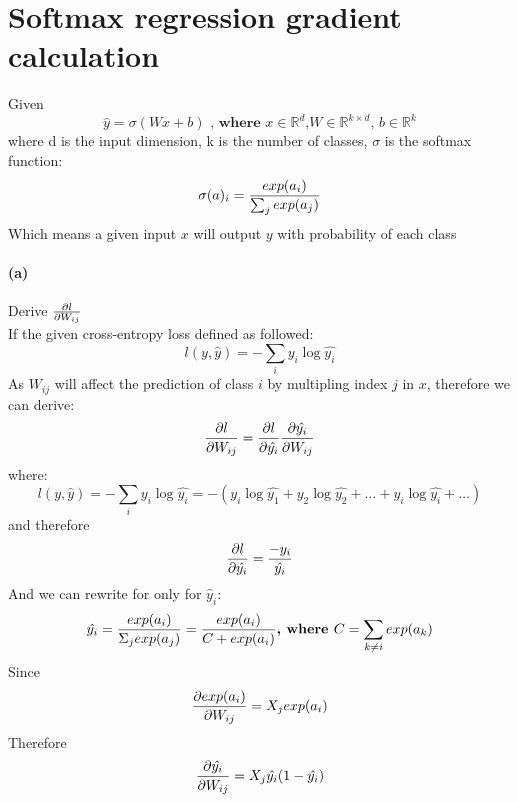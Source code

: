 \documentclass{article}
\begin{document}
\section{Softmax regression gradient calculation}
Given
\begin{equation}
\hat{y} = \sigma (Wx+b) \textbf{ , where $x \in \mathbb{R}^d$,$W \in \mathbb{R}^{k\times d}$, $b \in \mathbb{R}^k$}
\end{equation}
where d is the input dimension, k is the number of classes, $\sigma$ is the softmax function:
\begin{equation}
\sigma(a)_i = {exp(a_i) \over \sum_j exp(a_j)}
\end{equation}
Which means a given input $x$ will output $y$ with probability of each class

\paragraph{(a)} Derive ${\partial l\over \partial W_{ij}}$\\
If the given cross-entropy loss defined as followed:
\begin{equation}
l(y, \hat{y}) = -\sum_i y_i\log\hat{y_i}
\end{equation}
As $W_{ij}$ will affect the prediction of class $i$ by multipling index $j$ in $x$, therefore we can derive:
\begin{equation}
{\partial l\over \partial W_{ij}} = {\partial l \over \partial \hat{y_i}} {\partial \hat{y_i} \over \partial W_{ij}}
\end{equation}
where:
\begin{equation}
l(y, \hat{y}) = -\sum_i y_i\log\hat{y_i} = -(y_i\log\hat{y_1} + y_2\log\hat{y_2} + \dots + y_i\log\hat{y_i} + \dots)
\end{equation}
and therefore
\begin{equation}
{\partial l \over \partial \hat{y_i}} = {-y_i\over \hat{y_i}}
\end{equation}
And we can rewrite for only for $\hat y_i$:
\begin{equation}
\hat{y_i} = {exp(a_i) \over \Sigma_j exp(a_j)} = {exp(a_i) \over C + exp(a_i)} \textbf{,  where $C = \sum_{k\neq i} exp(a_k)$}
\end{equation}
Since
\begin{equation}
{\partial exp(a_i) \over \partial W_{ij}} = X_jexp(a_i)
\end{equation}
Therefore
\begin{equation}
{\partial \hat{y_i} \over \partial W_{ij}} = X_j\hat{y_i}(1-\hat{y_i})
\end{equation}
\end{document}
